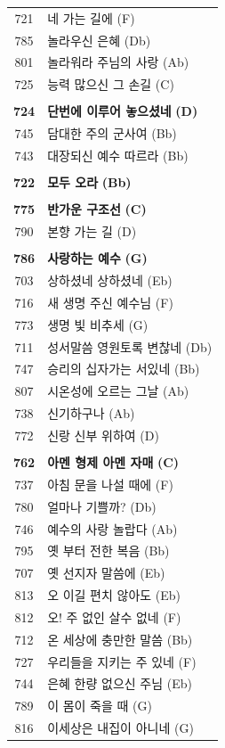 \begin{supertabular}{c l}
721 & 네 가는 길에 (F) \\
785 & 놀라우신 은혜 (Db) \\
801 & 놀라워라 주님의 사랑 (Ab) \\
725 & 능력 많으신 그 손길 (C) \\
 & \\
\textbf{724} & \textbf{단번에 이루어 놓으셨네} \textbf{(D)} \\
745 & 담대한 주의 군사여 (Bb) \\
743 & 대장되신 예수 따르라 (Bb) \\
 & \\
\textbf{722} & \textbf{모두 오라} \textbf{(Bb)} \\
 & \\
\textbf{775} & \textbf{반가운 구조선} \textbf{(C)} \\
790 & 본향 가는 길 (D) \\
 & \\
\textbf{786} & \textbf{사랑하는 예수} \textbf{(G)} \\
703 & 상하셨네 상하셨네 (Eb) \\
716 & 새 생명 주신 예수님 (F) \\
773 & 생명 빛 비추세 (G) \\
711 & 성서말씀 영원토록 변찮네 (Db) \\
747 & 승리의 십자가는 서있네 (Bb) \\
807 & 시온성에 오르는 그날 (Ab) \\
738 & 신기하구나 (Ab) \\
772 & 신랑 신부 위하여 (D) \\
 & \\
\textbf{762} & \textbf{아멘 형제 아멘 자매} \textbf{(C)} \\
737 & 아침 문을 나설 때에 (F) \\
780 & 얼마나 기쁠까? (Db) \\
746 & 예수의 사랑 놀랍다 (Ab) \\
795 & 옛 부터 전한 복음 (Bb) \\
707 & 옛 선지자 말씀에 (Eb) \\
813 & 오 이길 편치 않아도 (Eb) \\
812 & 오! 주 없인 살수 없네 (F) \\
712 & 온 세상에 충만한 말씀 (Bb) \\
727 & 우리들을 지키는 주 있네 (F) \\
744 & 은혜 한량 없으신 주님 (Eb) \\
789 & 이 몸이 죽을 때 (G) \\
816 & 이세상은 내집이 아니네 (G) \\

\end{supertabular}
